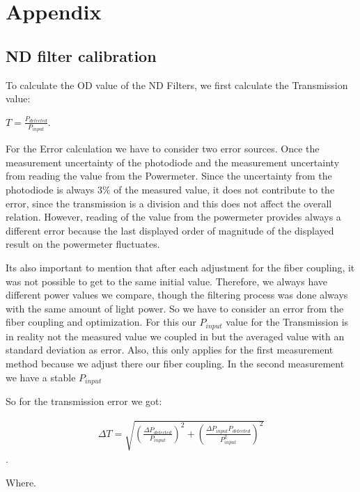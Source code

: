 \chapter{Appendix}
\label{sec:app}

\section{ND filter calibration}\label{sec:ND_filter_calibration}

To calculate the OD value of the ND Filters, we first calculate the Transmission value:

$T=\frac{P_{detected}}{P_{input}}$. 

For the Error calculation we have to consider two error sources.
Once the measurement uncertainty of the photodiode and the measurement uncertainty from reading the value from the Powermeter.
Since the uncertainty from the photodiode is always 3$\%$ of the measured value, it does not contribute to the error,
since the transmission is a division and this does not affect the overall relation.
However, reading of the value from the powermeter provides always a different error because the last displayed order of
magnitude of the displayed result on the powermeter fluctuates.

Its also important to mention that after each adjustment for the fiber coupling, it was not possible to get to the same
initial value.
Therefore, we always have different power values we compare, though the filtering process was done always with the same
amount of light power.
So we have to consider an error from the fiber coupling and optimization.
For this our $P_{input}$ value for the Transmission is in reality not the measured value we coupled in but
the averaged value with an standard deviation as error.
Also, this only applies for the first measurement method because we adjust there our fiber coupling.
In the second measurement we have a stable $P_{input}$

So for the transmission error we got:

\begin{align}
    \Delta T= \sqrt{\left(\frac{\Delta P_{detected}}{P_{input}}\right)^2 + \left(\frac{\Delta P_{input} P_{detected}}{ P_{input}^2}\right)^2}
\end{align}.

Where.

